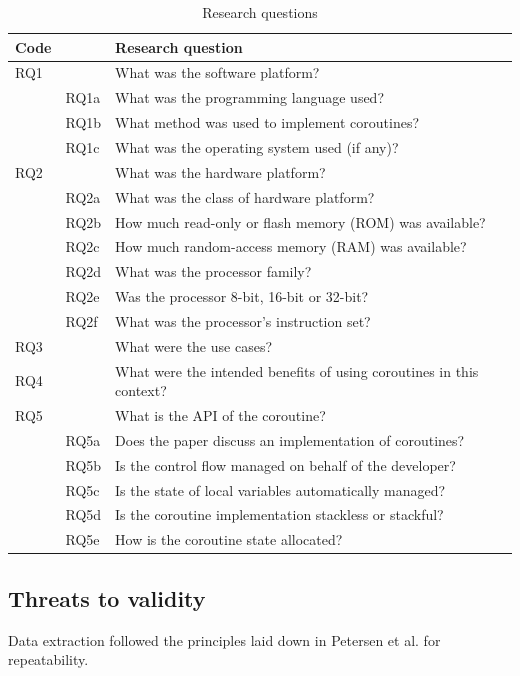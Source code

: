 \documentclass[format=acmsmall, review=false, screen=false]{acmart}
\begin{document}
\begin{table}[h]
	\caption{Research questions}
	\label{RQs}
	
	\begin{tabular}{l l l}
		\hline
		Code & & Research question \\
		\hline
		RQ1	& & What was the software platform?\\
		& RQ1a & What was the programming language used?\\
		& RQ1b & What method was used to implement coroutines?\\
		& RQ1c & What was the operating system used (if any)?\\
		RQ2	& & What was the hardware platform?\\
		& RQ2a & What was the class of hardware platform?\\
		& RQ2b & How much read-only or flash memory (ROM) was available?\\
		& RQ2c & How much random-access memory (RAM) was available?\\
		& RQ2d & What was the processor family?\\
		& RQ2e & Was the processor 8-bit, 16-bit or 32-bit?\\
		& RQ2f & What was the processor’s instruction set?\\
		RQ3	 &  & What were the use cases?\\
		RQ4	 &  & What were the intended benefits of using coroutines in this context?\\
		RQ5	 &  & What is the API of the coroutine?\\
		& RQ5a & Does the paper discuss an implementation of coroutines?\\
		& RQ5b & Is the control flow managed on behalf of the developer?\\
		& RQ5c & Is the state of local variables automatically managed?\\
		& RQ5d & Is the coroutine implementation stackless or stackful?\\
		& RQ5e & How is the coroutine state allocated?\\
		\hline
	\end{tabular}
\end{table}

\subsection{Threats to validity}

Data extraction followed the principles laid down in Petersen et al. \cite{Petersen2015} for repeatability.
\end{document}
